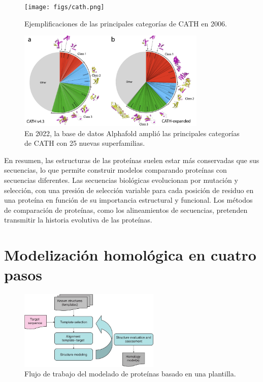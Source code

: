 \begin{figure}[h]
\centering
\texttt{[image: figs/cath.png]}
\caption{Ejemplificaciones de las principales categorías de CATH en 2006.}
\label{fig:cath}
\end{figure}

\begin{figure}[h]
\centering
\includegraphics[width = 0.8\textwidth]{figs/cath2.png}
\caption{En 2022, la base de datos Alphafold amplió las principales categorías de CATH con 25 nuevas superfamilias.}
\label{fig:cath2}
\end{figure}

En resumen, las estructuras de las proteínas suelen estar más conservadas que sus secuencias, lo que permite construir modelos comparando proteínas con secuencias diferentes. Las secuencias biológicas evolucionan por mutación y selección, con una presión de selección variable para cada posición de residuo en una proteína en función de su importancia estructural y funcional. Los métodos de comparación de proteínas, como los alineamientos de secuencias, pretenden transmitir la historia evolutiva de las proteínas.

\section{Modelización homológica en cuatro pasos}
\begin{figure}[h]
\centering
\includegraphics[width = 0.6\textwidth]{figs/homology_simple_workflow.png}
\caption{Flujo de trabajo del modelado de proteínas basado en una plantilla.}
\end{figure}


